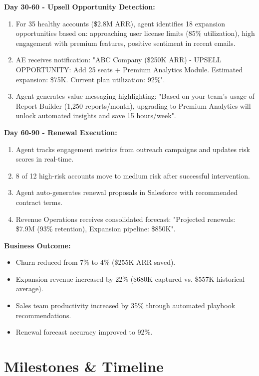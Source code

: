 \documentclass[12pt,a4paper]{article}
\begin{document}
\textbf{Day 30-60 - Upsell Opportunity Detection:}
\begin{enumerate}
    \item For 35 healthy accounts (\$2.8M ARR), agent identifies 18 expansion opportunities based on: approaching user license limits (85\% utilization), high engagement with premium features, positive sentiment in recent emails.
    \item AE receives notification: "ABC Company (\$250K ARR) - UPSELL OPPORTUNITY: Add 25 seats + Premium Analytics Module. Estimated expansion: \$75K. Current plan utilization: 92\%".
    \item Agent generates value messaging highlighting: "Based on your team’s usage of Report Builder (1,250 reports/month), upgrading to Premium Analytics will unlock automated insights and save 15 hours/week".
\end{enumerate}

\textbf{Day 60-90 - Renewal Execution:}
\begin{enumerate}
    \item Agent tracks engagement metrics from outreach campaigns and updates risk scores in real-time.
    \item 8 of 12 high-risk accounts move to medium risk after successful intervention.
    \item Agent auto-generates renewal proposals in Salesforce with recommended contract terms.
    \item Revenue Operations receives consolidated forecast: "Projected renewals: \$7.9M (93\% retention), Expansion pipeline: \$850K".
\end{enumerate}

\textbf{Business Outcome:}
\begin{itemize}
    \item Churn reduced from 7\% to 4\% (\$255K ARR saved).
    \item Expansion revenue increased by 22\% (\$680K captured vs. \$557K historical average).
    \item Sales team productivity increased by 35\% through automated playbook recommendations.
    \item Renewal forecast accuracy improved to 92\%.
\end{itemize}

\section{Milestones \& Timeline}
\end{document}
